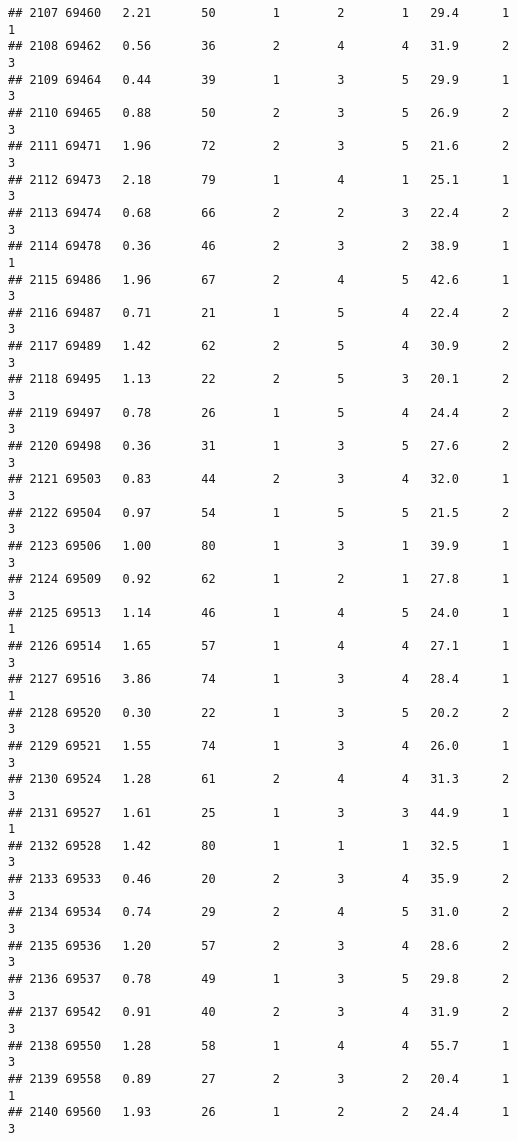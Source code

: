 \documentclass[
]{article}
\begin{document}
\begin{verbatim}
## 2107 69460   2.21       50        1        2        1   29.4      1      1
## 2108 69462   0.56       36        2        4        4   31.9      2      3
## 2109 69464   0.44       39        1        3        5   29.9      1      3
## 2110 69465   0.88       50        2        3        5   26.9      2      3
## 2111 69471   1.96       72        2        3        5   21.6      2      3
## 2112 69473   2.18       79        1        4        1   25.1      1      3
## 2113 69474   0.68       66        2        2        3   22.4      2      3
## 2114 69478   0.36       46        2        3        2   38.9      1      1
## 2115 69486   1.96       67        2        4        5   42.6      1      3
## 2116 69487   0.71       21        1        5        4   22.4      2      3
## 2117 69489   1.42       62        2        5        4   30.9      2      3
## 2118 69495   1.13       22        2        5        3   20.1      2      3
## 2119 69497   0.78       26        1        5        4   24.4      2      3
## 2120 69498   0.36       31        1        3        5   27.6      2      3
## 2121 69503   0.83       44        2        3        4   32.0      1      3
## 2122 69504   0.97       54        1        5        5   21.5      2      3
## 2123 69506   1.00       80        1        3        1   39.9      1      3
## 2124 69509   0.92       62        1        2        1   27.8      1      3
## 2125 69513   1.14       46        1        4        5   24.0      1      1
## 2126 69514   1.65       57        1        4        4   27.1      1      3
## 2127 69516   3.86       74        1        3        4   28.4      1      1
## 2128 69520   0.30       22        1        3        5   20.2      2      3
## 2129 69521   1.55       74        1        3        4   26.0      1      3
## 2130 69524   1.28       61        2        4        4   31.3      2      3
## 2131 69527   1.61       25        1        3        3   44.9      1      1
## 2132 69528   1.42       80        1        1        1   32.5      1      3
## 2133 69533   0.46       20        2        3        4   35.9      2      3
## 2134 69534   0.74       29        2        4        5   31.0      2      3
## 2135 69536   1.20       57        2        3        4   28.6      2      3
## 2136 69537   0.78       49        1        3        5   29.8      2      3
## 2137 69542   0.91       40        2        3        4   31.9      2      3
## 2138 69550   1.28       58        1        4        4   55.7      1      3
## 2139 69558   0.89       27        2        3        2   20.4      1      1
## 2140 69560   1.93       26        1        2        2   24.4      1      3

\end{verbatim}
\end{document}
